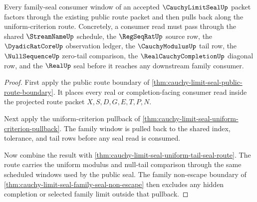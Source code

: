 \begin{theorem}
\label{thm:cauchy-limit-seal-family-window-pullback}
Every family-seal consumer window of an accepted $\CauchyLimitSealUp$ packet factors through the existing public route packet and then pulls back along the uniform-criterion route. Concretely, a consumer read must pass through the shared $\StreamNameUp$ schedule, the $\RegSeqRatUp$ source row, the $\DyadicRatCoreUp$ observation ledger, the $\CauchyModulusUp$ tail row, the $\NullSequenceUp$ zero-tail comparison, the $\RealCauchyCompletionUp$ diagonal row, and the $\RealUp$ seal before it reaches any downstream family consumer.
\end{theorem}
\begin{proof}
First apply the public route boundary of \autoref{thm:cauchy-limit-seal-public-route-boundary}. It places every real or completion-facing consumer read inside the projected route packet $X,S,D,G,E,T,P,N$.

Next apply the uniform-criterion pullback of \autoref{thm:cauchy-limit-seal-uniform-criterion-pullback}. The family window is pulled back to the shared index, tolerance, and tail rows before any seal read is consumed.

Now combine the result with \autoref{thm:cauchy-limit-seal-uniform-tail-seal-route}. The route carries the uniform modulus and null-tail comparison through the same scheduled windows used by the public seal. The family non-escape boundary of \autoref{thm:cauchy-limit-seal-family-seal-non-escape} then excludes any hidden completion or selected family limit outside that pullback.
\end{proof}

